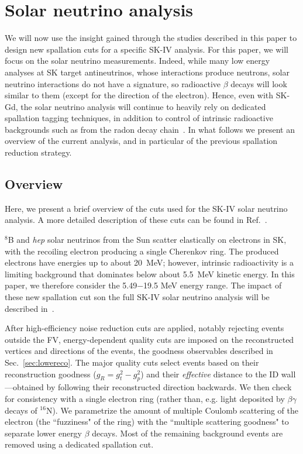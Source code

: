 \section{Solar neutrino analysis}
\label{sec:solaranalysis}
We will now use the insight gained through the studies described in this paper to design new spallation cuts for a specific SK-IV analysis. For this paper, we will focus on the solar neutrino measurements. Indeed, while many low energy analyses at SK target antineutrinos, whose interactions produce neutrons, solar neutrino interactions do not have a signature, so radioactive $\beta$ decays will look similar to them (except for the direction of the electron). Hence, even with SK-Gd, the solar neutrino analysis will continue to heavily rely on dedicated spallation tagging techniques, in addition to control of intrinsic radioactive backgrounds such as from the radon decay chain~\cite{Nakano:2019bnr}. In what follows we present an overview of the current analysis, and in particular of the previous spallation reduction strategy.

\subsection{Overview}
Here, we present a brief overview of the cuts used for the SK-IV solar neutrino analysis. A more detailed description of these cuts can be found in Ref.~\cite{skivsolar}.  

$^8$B and {\it hep} solar neutrinos from the Sun scatter elastically on electrons in SK, with the recoiling electron producing a single Cherenkov ring. The produced electrons have energies up to about 20~MeV; however, intrinsic radioactivity is a limiting background that dominates below about 5.5~MeV kinetic energy. In this paper, we therefore consider the 5.49$-$19.5 MeV energy range. The impact of these new spallation cut son the full SK-IV solar neutrino analysis will be described in~\cite{newsolarpaper}.

After high-efficiency noise reduction cuts are applied, notably rejecting events outside the FV, energy-dependent quality cuts are imposed on the reconstructed vertices and directions of the events, the goodness observables described in Sec.~\ref{sec:lowereco}. The major quality cuts select events based on their reconstruction goodness ($g_{R} = g^2_{t} - g^2_{p}$) and their \emph{effective} distance to the ID wall ---obtained by following their reconstructed direction backwards. We then check for consistency with a single electron ring (rather than, e.g. light deposited by $\beta\gamma$ decays of $^{16}$N). We parametrize the amount of multiple Coulomb scattering of the electron (the ``fuzziness" of the ring) with the ``multiple scattering goodness" to separate lower energy $\beta$ decays. Most of the remaining background events are removed using a dedicated spallation cut. 

